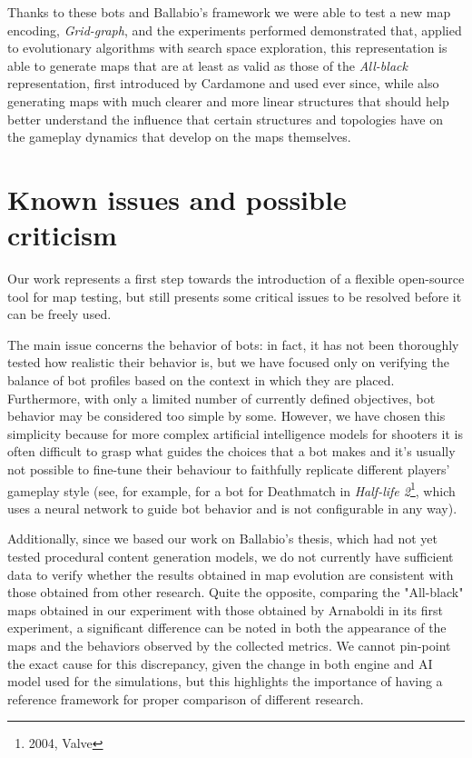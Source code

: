 \documentclass{Configuration_Files/PoliMi3i_thesis}
\begin{document}
Thanks to these bots and Ballabio's framework we were able to test a new map encoding, \textit{Grid-graph}, and the experiments performed demonstrated that, applied to evolutionary algorithms with search space exploration, this representation is able to generate maps that are at least as valid as those of the \textit{All-black} representation, first introduced by Cardamone \cite{cardamone_evolving_maps} and used ever since, while also generating maps with much clearer and more linear structures that should help better understand the influence that certain structures and topologies have on the gameplay dynamics that develop on the maps themselves.

\section{Known issues and possible criticism}
Our work represents a first step towards the introduction of a flexible open-source tool for map testing, but still presents some critical issues to be resolved before it can be freely used.

The main issue concerns the behavior of bots: in fact, it has not been thoroughly tested how realistic their behavior is, but we have focused only on verifying the balance of bot profiles based on the context in which they are placed. Furthermore, with only a limited number of currently defined objectives, bot behavior may be considered too simple by some. However, we have chosen this simplicity because for more complex artificial intelligence models for shooters it is often difficult to grasp what guides the choices that a bot makes and it's usually not possible to fine-tune their behaviour to faithfully replicate different players' gameplay style (see, for example, \cite{neural_network_bot_2} for a bot for Deathmatch in \textit{Half-life 2}\footnote{2004, Valve}, which uses a neural network to guide bot behavior and is not configurable in any way).

Additionally, since we based our work on Ballabio's thesis, which had not yet tested procedural content generation models, we do not currently have sufficient data to verify whether the results obtained in map evolution are consistent with those obtained from other research. Quite the opposite, comparing the "All-black" maps obtained in our experiment with those obtained by Arnaboldi \cite{arnaboldi_framework} in its first experiment, a significant difference can be noted in both the appearance of the maps and the behaviors observed by the collected metrics. We cannot pin-point the exact cause for this discrepancy, given the change in both engine and AI model used for the simulations, but this highlights the importance of having a reference framework for proper comparison of different research.
\end{document}
